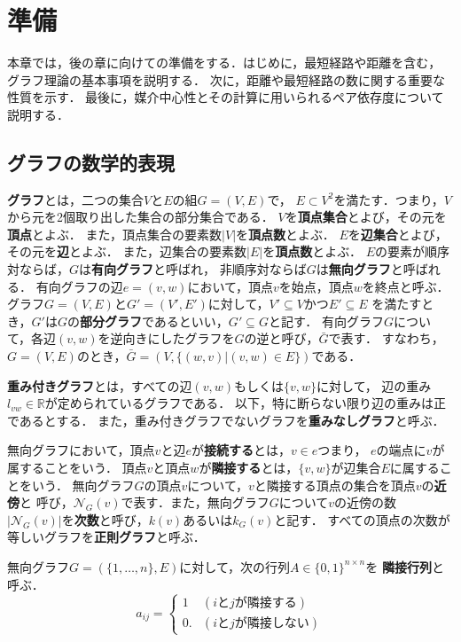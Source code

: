 \chapter{準備}
\label{chap:preliminary}
本章では，後の章に向けての準備をする．はじめに，最短経路や距離を含む，
グラフ理論の基本事項を説明する．
次に，距離や最短経路の数に関する重要な性質を示す．
最後に，媒介中心性とその計算に用いられるペア依存度について説明する．

\section{グラフの数学的表現}
\label{sect:graph-theory}

\textbf{グラフ}とは，二つの集合$V$と$E$の組$G=(V,E)$で，
$E\subset V^2$を満たす．つまり，$V$から元を2個取り出した集合の部分集合である．
$V$を\textbf{頂点集合}とよび，その元を\textbf{頂点}とよぶ．
また，頂点集合の要素数$|V|$を\textbf{頂点数}とよぶ．
$E$を\textbf{辺集合}とよび，その元を\textbf{辺}とよぶ．
また，辺集合の要素数$|E|$を\textbf{頂点数}とよぶ．
$E$の要素が順序対ならば，$G$は\textbf{有向グラフ}と呼ばれ，
非順序対ならば$G$は\textbf{無向グラフ}と呼ばれる．
有向グラフの辺$e=(v,w)$において，頂点$v$を始点，頂点$w$を終点と呼ぶ．
グラフ$G=(V,E)$と$G'=(V',E')$に対して，$V'\subseteq V$かつ$E'\subseteq E$
を満たすとき，$G'$は$G$の\textbf{部分グラフ}であるといい，$G'\subseteq G$と記す．
有向グラフ$G$について，各辺$(v,w)$を逆向きにしたグラフを$G$の逆と呼び，$\bar{G}$で表す．
すなわち，$G=(V,E)$のとき，$\bar{G}=(V,\{(w,v)|(v,w)\in E\})$である．

\textbf{重み付きグラフ}とは，すべての辺$(v,w)$もしくは$\{v,w\}$に対して，
辺の重み$l_{vw}\in\mathbb{R}$が定められているグラフである．
以下，特に断らない限り辺の重みは正であるとする．
また，重み付きグラフでないグラフを\textbf{重みなしグラフ}と呼ぶ．

無向グラフにおいて，頂点$v$と辺$e$が\textbf{接続する}とは，$v\in e$つまり，
$e$の端点に$v$が属することをいう．
頂点$v$と頂点$w$が\textbf{隣接する}とは，$\{v,w\}$が辺集合$E$に属することをいう．
無向グラフ$G$の頂点$v$について，$v$と隣接する頂点の集合を頂点$v$の\textbf{近傍}と
呼び，$\mathcal{N}_G(v)$で表す．また，無向グラフ$G$について$v$の近傍の数
$|\mathcal{N}_G(v)|$を\textbf{次数}と呼び，$k(v)$あるいは$k_G(v)$と記す．
すべての頂点の次数が等しいグラフを\textbf{正則グラフ}と呼ぶ．

無向グラフ$G=(\{1,\ldots,n\},E)$に対して，次の行列$A\in\{0,1\}^{n\times n}$を
\textbf{隣接行列}と呼ぶ．
\begin{equation*}
  a_{ij}=
  \begin{cases}
    1 & (i\text{と}j\text{が隣接する}) \\
    0. & (i\text{と}j\text{が隣接しない})
  \end{cases}
\end{equation*}

